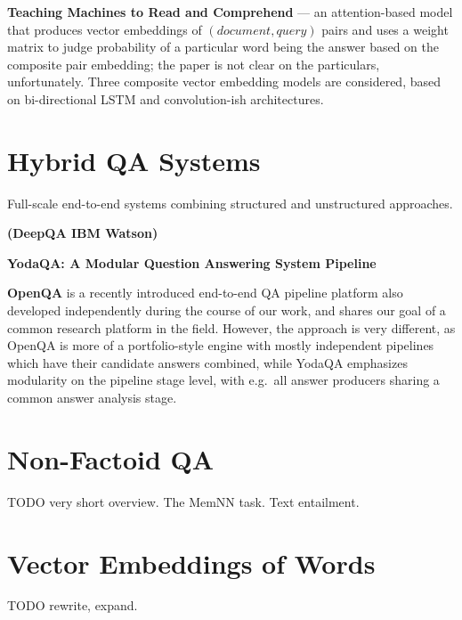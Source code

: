 \textbf{Teaching Machines to Read and Comprehend} \citep{ReadAndComprehend}
	--- an attention-based model that produces vector embeddings of $(document, query)$
	pairs and uses a weight matrix to judge probability of a particular
	word being the answer based on the composite pair embedding;
	the paper is not clear on the particulars, unfortunately.
	Three composite vector embedding models are considered,
	based on bi-directional LSTM and convolution-ish architectures.




\section{Hybrid QA Systems}

Full-scale end-to-end systems combining structured and unstructured approaches.

\textbf{(DeepQA IBM Watson)} \citep{WatsonOverview}

\textbf{YodaQA: A Modular Question Answering System Pipeline} \citep{YodaQAPoster2015}

\textbf{OpenQA} \citep{OpenQA} is a recently introduced end-to-end QA pipeline platform
also developed independently during the course of our work, and shares our
goal of a common research platform in the field.  However, the approach
is very different, as OpenQA is more of a portfolio-style engine with
mostly independent pipelines which have their candidate answers combined,
while YodaQA emphasizes modularity on the pipeline stage level,
with e.g.\ all answer producers sharing a common answer analysis stage.





\section{Non-Factoid QA}
\label{sec:nonfactoid}

TODO very short overview.  The MemNN task.  Text entailment.





\section{Vector Embeddings of Words}
\label{sec:embeddings}

TODO rewrite, expand.

